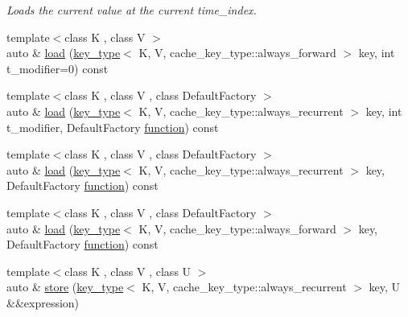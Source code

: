 \begin{DoxyCompactItemize}
\begin{DoxyCompactList}\small\item\em Loads the current value at the current time\+\_\+index. \end{DoxyCompactList}\item 
{\footnotesize template$<$class K , class V $>$ }\\auto \& \hyperlink{structbc_1_1nn_1_1Cache_a0147ffcacb937b2477aff74a40f8884c}{load} (\hyperlink{structbc_1_1nn_1_1Cache_aedd77c5710dcb5f9edd8ecb3c3041048}{key\+\_\+type}$<$ K, V, cache\+\_\+key\+\_\+type\+::always\+\_\+forward $>$ key, int t\+\_\+modifier=0) const
\item 
{\footnotesize template$<$class K , class V , class Default\+Factory $>$ }\\auto \& \hyperlink{structbc_1_1nn_1_1Cache_ae0d930bedea24e5afc933c2ddb361770}{load} (\hyperlink{structbc_1_1nn_1_1Cache_aedd77c5710dcb5f9edd8ecb3c3041048}{key\+\_\+type}$<$ K, V, cache\+\_\+key\+\_\+type\+::always\+\_\+recurrent $>$ key, int t\+\_\+modifier, Default\+Factory \hyperlink{namespacebc_1_1nn_a0fef36d0002a6d7c7cb619d7e27d5c1e}{function}) const
\item 
{\footnotesize template$<$class K , class V , class Default\+Factory $>$ }\\auto \& \hyperlink{structbc_1_1nn_1_1Cache_a8cddd3d99d6e5b2a8999aed78159e83e}{load} (\hyperlink{structbc_1_1nn_1_1Cache_aedd77c5710dcb5f9edd8ecb3c3041048}{key\+\_\+type}$<$ K, V, cache\+\_\+key\+\_\+type\+::always\+\_\+recurrent $>$ key, Default\+Factory \hyperlink{namespacebc_1_1nn_a0fef36d0002a6d7c7cb619d7e27d5c1e}{function}) const
\item 
{\footnotesize template$<$class K , class V , class Default\+Factory $>$ }\\auto \& \hyperlink{structbc_1_1nn_1_1Cache_a62ccfaf7cce58a593c3793b187380a46}{load} (\hyperlink{structbc_1_1nn_1_1Cache_aedd77c5710dcb5f9edd8ecb3c3041048}{key\+\_\+type}$<$ K, V, cache\+\_\+key\+\_\+type\+::always\+\_\+forward $>$ key, Default\+Factory \hyperlink{namespacebc_1_1nn_a0fef36d0002a6d7c7cb619d7e27d5c1e}{function}) const
\item 
{\footnotesize template$<$class K , class V , class U $>$ }\\auto \& \hyperlink{structbc_1_1nn_1_1Cache_a8bab29fabb515c53dd65b1c82f91df96}{store} (\hyperlink{structbc_1_1nn_1_1Cache_aedd77c5710dcb5f9edd8ecb3c3041048}{key\+\_\+type}$<$ K, V, cache\+\_\+key\+\_\+type\+::always\+\_\+recurrent $>$ key, U \&\&expression)
\item 

\end{DoxyCompactItemize}
